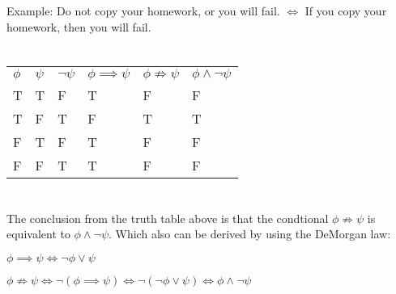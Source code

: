 \documentclass{article}
\begin{document}
Example:
Do not copy your homework, or you will fail. $\Leftrightarrow$ If you copy your homework, then you will fail.

\section{}
\begin{tabular}{ l l l l l l }
  $\phi$ & $\psi$ & $\neg \psi$ & $\phi \implies \psi$ & $\phi \not\Rightarrow \psi$ & $\phi \wedge \neg \psi$ \\
  T      & T      & F           & T                    & F                           & F                       \\
  T      & F      & T           & F                    & T                           & T                       \\
  F      & T      & F           & T                    & F                           & F                       \\
  F      & F      & T           & T                    & F                           & F                       \\
\end{tabular}

\section{}
The conclusion from the truth table above is that the condtional $\phi \not\Rightarrow \psi$ is equivalent to $\phi \wedge \neg \psi$.
Which also can be derived by using the DeMorgan law:

$\phi \implies \psi \Leftrightarrow \neg \phi \vee \psi$

$\phi \not\Rightarrow \psi \Leftrightarrow \neg(\phi \implies \psi) \Leftrightarrow \neg(\neg \phi \vee \psi) \Leftrightarrow \phi \wedge \neg \psi$ 
\end{document}
